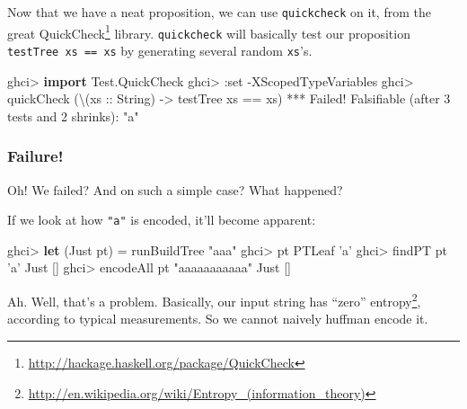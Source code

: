 \documentclass[]{article}
\newenvironment{Shaded}{}{}
\newcommand{\CharTok}[1]{\textcolor[rgb]{0.25,0.44,0.63}{#1}}
\newcommand{\DataTypeTok}[1]{\textcolor[rgb]{0.56,0.13,0.00}{#1}}
\newcommand{\DecValTok}[1]{\textcolor[rgb]{0.25,0.63,0.44}{#1}}
\newcommand{\FunctionTok}[1]{\textcolor[rgb]{0.02,0.16,0.49}{#1}}
\newcommand{\KeywordTok}[1]{\textcolor[rgb]{0.00,0.44,0.13}{\textbf{#1}}}
\newcommand{\NormalTok}[1]{#1}
\newcommand{\OtherTok}[1]{\textcolor[rgb]{0.00,0.44,0.13}{#1}}
\newcommand{\StringTok}[1]{\textcolor[rgb]{0.25,0.44,0.63}{#1}}
\renewcommand{\href}[2]{#2\footnote{\url{#1}}}
\begin{document}
Now that we have a neat proposition, we can use \texttt{quickcheck} on it, from
the great \href{http://hackage.haskell.org/package/QuickCheck}{QuickCheck}
library. \texttt{quickcheck} will basically test our proposition
\texttt{testTree\ xs\ ==\ xs} by generating several random \texttt{xs}'s.

\begin{Shaded}
\begin{Highlighting}[]
\NormalTok{ghci}\FunctionTok{>} \KeywordTok{import} \DataTypeTok{Test.QuickCheck}
\NormalTok{ghci}\FunctionTok{>} \FunctionTok{:}\NormalTok{set }\FunctionTok{-}\DataTypeTok{XScopedTypeVariables}
\NormalTok{ghci}\FunctionTok{>}\NormalTok{ quickCheck (\textbackslash{}(}\OtherTok{xs ::} \DataTypeTok{String}\NormalTok{) }\OtherTok{->}\NormalTok{ testTree xs }\FunctionTok{==}\NormalTok{ xs)}
\FunctionTok{***} \DataTypeTok{Failed}\FunctionTok{!} \DataTypeTok{Falsifiable}\NormalTok{ (after }\DecValTok{3}\NormalTok{ tests and }\DecValTok{2}\NormalTok{ shrinks)}\FunctionTok{:}
\StringTok{"a"}
\end{Highlighting}
\end{Shaded}

\hypertarget{failure}{%
\subsubsection{Failure!}\label{failure}}

Oh! We failed? And on such a simple case? What happened?

If we look at how \texttt{"a"} is encoded, it'll become apparent:

\begin{Shaded}
\begin{Highlighting}[]
\NormalTok{ghci}\FunctionTok{>} \KeywordTok{let}\NormalTok{ (}\DataTypeTok{Just}\NormalTok{ pt) }\FunctionTok{=}\NormalTok{ runBuildTree }\StringTok{"aaa"}
\NormalTok{ghci}\FunctionTok{>}\NormalTok{ pt}
\DataTypeTok{PTLeaf} \CharTok{'a'}
\NormalTok{ghci}\FunctionTok{>}\NormalTok{ findPT pt }\CharTok{'a'}
\DataTypeTok{Just}\NormalTok{ []}
\NormalTok{ghci}\FunctionTok{>}\NormalTok{ encodeAll pt }\StringTok{"aaaaaaaaaaa"}
\DataTypeTok{Just}\NormalTok{ []}
\end{Highlighting}
\end{Shaded}

Ah. Well, that's a problem. Basically, our input string has
\href{http://en.wikipedia.org/wiki/Entropy_(information_theory)}{``zero''
entropy}, according to typical measurements. So we cannot naively huffman encode
it.
\end{document}
